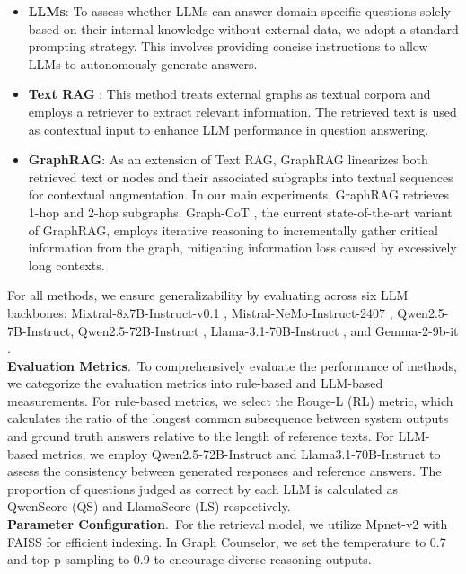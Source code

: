 \documentclass[11pt]{article}
\begin{document}
\begin{itemize}
\item \textbf{LLMs}: To assess whether LLMs can answer domain-specific questions solely based on their internal knowledge without external data, we adopt a standard prompting strategy. This involves providing concise instructions to allow LLMs to autonomously generate answers.
\item \textbf{Text RAG} \citep{gao2023retrieval}: This method treats external graphs as textual corpora and employs a retriever to extract relevant information. The retrieved text is used as contextual input to enhance LLM performance in question answering.
\item \textbf{GraphRAG}: As an extension of Text RAG, GraphRAG linearizes both retrieved text or nodes and their associated subgraphs into textual sequences for contextual augmentation. In our main experiments, GraphRAG \citep{ye-etal-2024-language} retrieves 1-hop and 2-hop subgraphs. Graph-CoT \citep{DBLP:conf/acl/JinXZRZL0TWM024}, the current state-of-the-art variant of GraphRAG, employs iterative reasoning to incrementally gather critical information from the graph, mitigating information loss caused by excessively long contexts.
\end{itemize}
For all methods, we ensure generalizability by evaluating across six LLM backbones: Mixtral-8x7B-Instruct-v0.1 , Mistral-NeMo-Instruct-2407 \citep{mixtral2024}, Qwen2.5-7B-Instruct, Qwen2.5-72B-Instruct \citep{yang2024qwen2}, Llama-3.1-70B-Instruct \citep{dubey2024llama}, and Gemma-2-9b-it \citep{team2024gemma}.\\
\textbf{Evaluation Metrics}. \,To comprehensively evaluate the performance of methods, we categorize the evaluation metrics into rule-based and LLM-based measurements. For rule-based metrics, we select the Rouge-L (RL) metric, which calculates the ratio of the longest common subsequence between system outputs and ground truth answers relative to the length of reference texts. For LLM-based metrics, we employ Qwen2.5-72B-Instruct and Llama3.1-70B-Instruct to assess the consistency between generated responses and reference answers. The proportion of questions judged as correct by each LLM is calculated as QwenScore (QS) and LlamaScore (LS) respectively.\\
\textbf{Parameter Configuration}. \,For the retrieval model, we utilize Mpnet-v2 \citep{10.5555/3495724.3497138} with FAISS \citep{johnson2019billion} for efficient indexing. In Graph Counselor, we set the temperature to 0.7 and top-p sampling to 0.9 to encourage diverse reasoning outputs.
\end{document}
